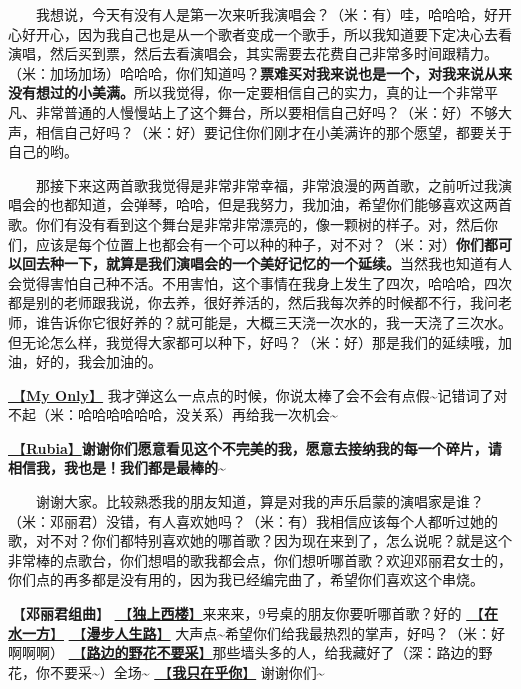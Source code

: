 \documentclass[]{ctexbook}
\begin{document}
  我想说，今天有没有人是第一次来听我演唱会？（米：有）哇，哈哈哈，好开心好开心，因为我自己也是从一个歌者变成一个歌手，所以我知道要下定决心去看演唱，然后买到票，然后去看演唱会，其实需要去花费自己非常多时间跟精力。（米：加场加场）哈哈哈，你们知道吗？\textbf{票难买对我来说也是一个，对我来说从来没有想过的小美满。}所以我觉得，你一定要相信自己的实力，真的让一个非常平凡、非常普通的人慢慢站上了这个舞台，所以要相信自己好吗？（米：好）不够大声，相信自己好吗？（米：好）要记住你们刚才在小美满许的那个愿望，都要关于自己的哟。

  那接下来这两首歌我觉得是非常非常幸福，非常浪漫的两首歌，之前听过我演唱会的也都知道，会弹琴，哈哈，但是我努力，我加油，希望你们能够喜欢这两首歌。你们有没有看到这个舞台是非常非常漂亮的，像一颗树的样子。对，然后你们，应该是每个位置上也都会有一个可以种的种子，对不对？（米：对）\textbf{你们都可以回去种一下，就算是我们演唱会的一个美好记忆的一个延续。}当然我也知道有人会觉得害怕自己种不活。不用害怕，这个事情在我身上发生了四次，哈哈哈，四次都是别的老师跟我说，你去养，很好养活的，然后我每次养的时候都不行，我问老师，谁告诉你它很好养的？就可能是，大概三天浇一次水的，我一天浇了三次水。但无论怎么样，我觉得大家都可以种下，好吗？（米：好）那是我们的延续哦，加油，好的，我会加油的。

\hyperref[my-only]{🎵【\textbf{My Only}】} 我才弹这么一点点的时候，你说太棒了会不会有点假\textasciitilde 记错词了对不起（米：哈哈哈哈哈哈，没关系）再给我一次机会\textasciitilde{}

\hyperref[rubia]{🎵【\textbf{Rubia}】}\textbf{谢谢你们愿意看见这个不完美的我，愿意去接纳我的每一个碎片，请相信我，我也是！我们都是最棒的\textasciitilde{}}

  谢谢大家。比较熟悉我的朋友知道，算是对我的声乐启蒙的演唱家是谁？（米：邓丽君）没错，有人喜欢她吗？（米：有）我相信应该每个人都听过她的歌，对不对？你们都特别喜欢她的哪首歌？因为现在来到了，怎么说呢？就是这个非常棒的点歌台，你们想唱的歌我都会点，你们想听哪首歌？欢迎邓丽君女士的，你们点的再多都是没有用的，因为我已经编完曲了，希望你们喜欢这个串烧。

🎵【\textbf{邓丽君组曲}】
\hyperref[one-in-the-building]{🎵【\textbf{独上西楼}】}来来来，9号桌的朋友你要听哪首歌？好的
\hyperref[on-the-water-side]{🎵【\textbf{在水一方}】}
\hyperref[walk-the-road-of-life]{🎵【\textbf{漫步人生路}】} 大声点\textasciitilde 希望你们给我最热烈的掌声，好吗？（米：好啊啊啊）
\hyperref[only-with-me]{🎵【\textbf{路边的野花不要采}】}那些墙头多的人，给我藏好了（深：路边的野花，你不要采\textasciitilde）全场\textasciitilde{}
\hyperref[only-you]{🎵【\textbf{我只在乎你}】} 谢谢你们\textasciitilde{}
\end{document}

